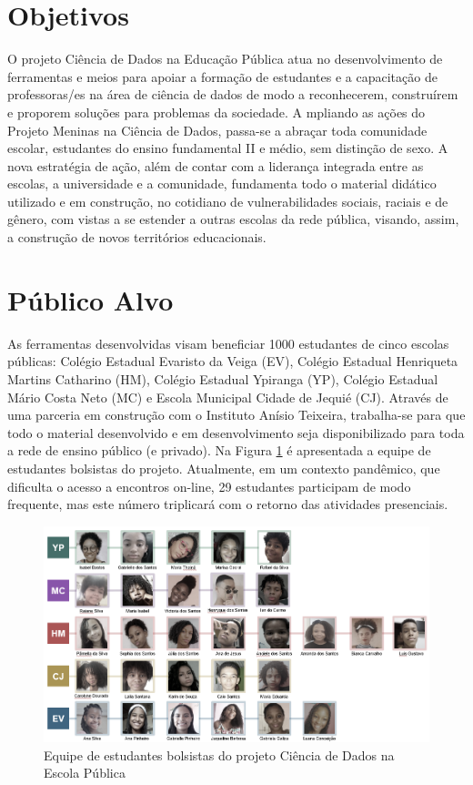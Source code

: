 \documentclass[
]{book}
\begin{document}
\hypertarget{objetivos}{%
\section*{Objetivos}\label{objetivos}}

O projeto Ciência de Dados na Educação Pública
atua no desenvolvimento de ferramentas e meios para
apoiar a formação de estudantes e a capacitação de
professoras/es na área de ciência de dados de modo
a reconhecerem, construírem e proporem soluções
para problemas da sociedade.
A mpliando as ações do Projeto Meninas na Ciência
de Dados, passa-se a abraçar toda comunidade
escolar, estudantes do ensino fundamental II e médio,
sem distinção de sexo.
A nova estratégia de ação, além de contar com a
liderança integrada entre as escolas, a universidade e
a comunidade, fundamenta todo o material didático
utilizado e em construção, no cotidiano de vulnerabilidades sociais, raciais e de gênero, com vistas a se estender a outras
escolas da rede pública, visando, assim, a construção de novos territórios educacionais.

\hypertarget{puxfablico-alvo}{%
\section*{Público Alvo}\label{puxfablico-alvo}}

As ferramentas desenvolvidas visam beneficiar 1000 estudantes de cinco escolas públicas: Colégio Estadual Evaristo da Veiga (EV), Colégio Estadual Henriqueta Martins Catharino (HM), Colégio Estadual Ypiranga (YP), Colégio Estadual Mário Costa Neto (MC) e Escola Municipal Cidade de Jequié (CJ).
Através de uma parceria em construção com o Instituto Anísio Teixeira, trabalha-se para que todo o material desenvolvido e em desenvolvimento seja disponibilizado para toda a rede de ensino público (e privado).
Na Figura \ref{fig:estudcdnaep} é apresentada a equipe de estudantes bolsistas do projeto. Atualmente, em um contexto pandêmico, que dificulta o acesso a encontros on-line, 29 estudantes participam de modo frequente, mas este número triplicará com o retorno das atividades presenciais.

\begin{figure}
\includegraphics[width=13.93in]{images/image111} \caption{Equipe de estudantes bolsistas do projeto Ciência de Dados na Escola Pública}\label{fig:estudcdnaep}
\end{figure}
\end{document}
